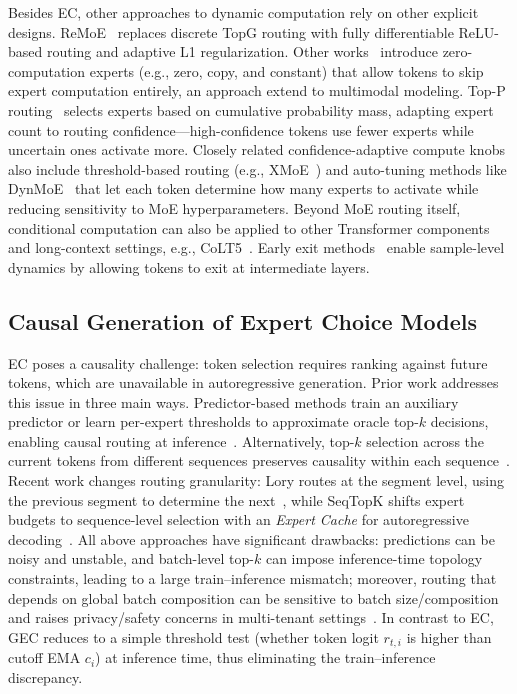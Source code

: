 \documentclass{article}
\theoremstyle{plain}
\theoremstyle{definition}
\theoremstyle{remark}
\begin{document}
Besides EC, other approaches to dynamic computation rely on other explicit designs. ReMoE~\cite{wang2025remoe} replaces discrete TopG routing with fully differentiable ReLU-based routing and adaptive L1 regularization.
Other works~\cite{jin2024moe++, longcat2025, zeng2024adamoe} introduce zero-computation experts (e.g., zero, copy, and constant) that allow tokens to skip expert computation entirely, an approach \citet{kilian2026datasparsity} extend to multimodal modeling.
Top-P routing~\cite{liu2024unimoeaudio, jin2025dtop_p, huang2024hardertasksneedexperts, wang2025hmoe} selects experts based on cumulative probability mass, adapting expert count to routing confidence—high-confidence tokens use fewer experts while uncertain ones activate more.
Closely related confidence-adaptive compute knobs also include threshold-based routing (e.g., XMoE~\cite{yang2024xmoe}) and auto-tuning methods like DynMoE~\cite{guo2025dynamicmixtureexpertsautotuning} that let each token determine how many experts to activate while reducing sensitivity to MoE hyperparameters. Beyond MoE routing itself, conditional computation can also be applied to other Transformer components and long-context settings, e.g., CoLT5~\cite{ainslie-etal-2023-colt5}.
Early exit methods~\cite{xin2020deebert} enable sample-level dynamics by allowing tokens to exit at intermediate layers.

\subsection{Causal Generation of Expert Choice Models}
\label{subsec:causal_generation_ec}

EC poses a causality challenge: token selection requires ranking against future tokens, which are unavailable in autoregressive generation.
Prior work addresses this issue in three main ways. Predictor-based methods train an auxiliary predictor or learn per-expert thresholds to approximate oracle top-$k$ decisions, enabling causal routing at inference~\cite{raposo2024mixture, shi2025diffmoe}. Alternatively, top-$k$ selection across the current tokens from different sequences preserves causality within each sequence~\cite{ludziejewski2024scaling, wen2025seqtopk}. Recent work changes routing granularity: Lory routes at the segment level, using the previous segment to determine the next~\cite{zhong2024lory}, while SeqTopK shifts expert budgets to sequence-level selection with an \emph{Expert Cache} for autoregressive decoding~\cite{wen2025seqtopk}.
All above approaches have significant drawbacks: predictions can be noisy and unstable, and batch-level top-$k$ can impose inference-time topology constraints, leading to a large train--inference mismatch; moreover, routing that depends on global batch composition can be sensitive to batch size/composition and raises privacy/safety concerns in multi-tenant settings~\cite{wen2025seqtopk}. In contrast to EC, GEC reduces to a simple threshold test (whether token logit $r_{t,i}$ is higher than cutoff EMA $c_i$) at inference time, thus eliminating the train--inference discrepancy.
\end{document}

